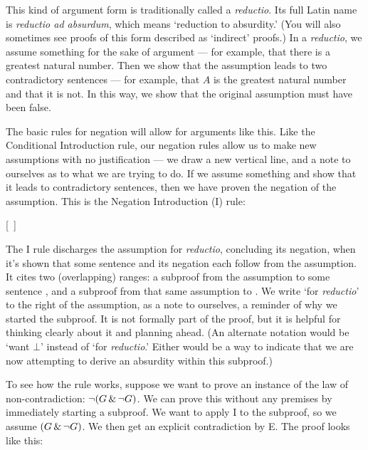 This kind of argument form is traditionally called a \emph{reductio}. Its full Latin name is \emph{reductio ad absurdum}, which means `reduction to absurdity.' (You will also sometimes see proofs of this form described as `indirect' proofs.) In a \emph{reductio}, we assume something for the sake of argument --- for example, that there is a greatest natural number. Then we show that the assumption leads to two contradictory sentences --- for example, that $A$ is the greatest natural number and that it is not. In this way, we show that the original assumption must have been false.

The basic rules for negation will allow for arguments like this. Like the Conditional Introduction rule, our negation rules allow us to make new assumptions with no justification --- we draw a new vertical line, and a note to ourselves as to what we are trying to do. If we assume something and show that it leads to contradictory sentences, then we have proven the negation of the assumption. This is the Negation Introduction ({\enot}I) rule:

\begin{ndproof}
\open
	\metaA{}
	\metaB{}
\close
{}[\ ]{\enot\metaA{}}
\end{ndproof}

The {\enot}I rule discharges the assumption for \emph{reductio}, concluding its negation, when it's shown that some sentence and its negation each follow from the assumption. It cites two (overlapping) ranges: a subproof from the assumption to some sentence \metaB{}, and a subproof from that same assumption to \enot\metaB{}. We write `for \emph{reductio}' to the right of the assumption, as a note to ourselves, a reminder of why we started the subproof. It is not formally part of the proof, but it is helpful for thinking clearly about it and planning ahead. (An alternate notation would be `want $\bot$' instead of `for \emph{reductio}.' Either would be a way to indicate that we are now attempting to derive an absurdity within this subproof.)

To see how the rule works, suppose we want to prove an instance of the law of non-contradiction: $\neg(G \,\&\, \neg G)$. We can prove this without any premises by immediately starting a subproof. We want to apply {\enot}I to the subproof, so we assume $(G \,\&\, \neg G)$. We then get an explicit contradiction by {\eand}E. The proof looks like this:

